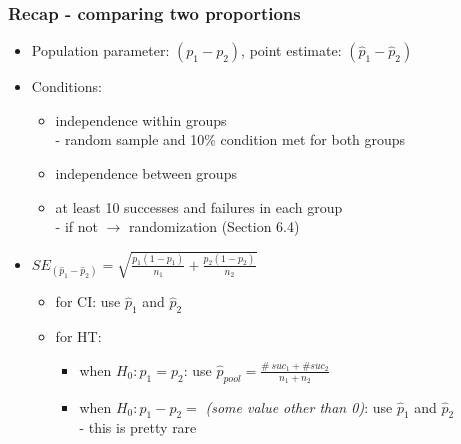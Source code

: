 \documentclass[notes,11pt, aspectratio=169]{beamer}
\begin{document}
\begin{frame}
\frametitle{Recap - comparing two proportions}

\begin{itemize}

\item Population parameter: $(p_1 - p_2)$, point estimate: $(\hat{p}_1 - \hat{p}_2)$

\pause

\item Conditions:
\pause
\begin{itemize}
\item independence within groups \\
- random sample and 10\% condition met for both groups
\item independence between groups
\item at least 10 successes and failures in each group\\ 
- if not $\rightarrow$ randomization (Section 6.4)
\end{itemize}

\pause

\item $SE_{(\hat{p}_1 - \hat{p}_2)} = \sqrt{ \frac{p_1(1-p_1)}{n_1} + \frac{p_2(1-p_2)}{n_2} }$
\begin{itemize}
\item for CI: use $\hat{p}_1$ and $\hat{p}_2$
\item for HT:
\begin{itemize}
\item when $H_0: p_1 = p_2$: use $\hat{p}_{pool} = \frac{\#~suc_1 + \#suc_2}{n_1 + n_2}$
\item when $H_0: p_1 - p_2 = $ \textit{(some value other than 0)}: use $\hat{p}_1$ and $\hat{p}_2$ \\
- this is pretty rare
\end{itemize}
\end{itemize}

\end{itemize}

\end{frame}

\end{document}
